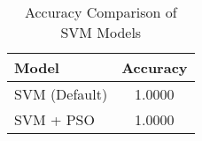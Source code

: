 \begin{table}[ht]
\centering
\caption{Accuracy Comparison of SVM Models}
\begin{tabular}{l|c}
\toprule
Model & Accuracy \\
\midrule
SVM (Default) & 1.0000 \\
SVM + PSO & 1.0000 \\
\bottomrule
\end{tabular}
\end{table}

